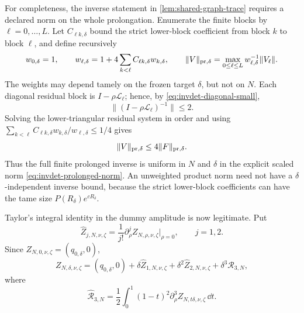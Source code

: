 For completeness, the inverse statement in \cref{lem:shared-graph-trace}
requires a declared norm on the whole prolongation.  Enumerate the finite
blocks by \(\ell=0,\ldots,L\).  Let \(C_{\ell k,\delta}\) bound the strict
lower-block coefficient from block \(k\) to block \(\ell\), and define
recursively
\begin{equation}
 w_{0,\delta}=1,\qquad
 w_{\ell,\delta}
 =1+4\sum_{k<\ell}C_{\ell k,\delta}w_{k,\delta},
 \qquad
 \|V\|_{\rm pr,\delta}
 =\max_{0\leq\ell\leq L}
     w_{\ell,\delta}^{-1}\|V_\ell\|.                \label{eq:invdet-prolonged-norm}
\end{equation}
The weights may depend tamely on the frozen target \(\delta\), but not on
\(N\).  Each diagonal residual block is
\(I-\rho\mathscr L_\ell\); hence, by
\cref{eq:invdet-diagonal-small},
\begin{equation}
 \|(I-\rho\mathscr L_\ell)^{-1}\|\leq2.             \label{eq:invdet-diagonal-inverse}
\end{equation}
Solving the lower-triangular residual system in order and using
\(\sum_{k<\ell}C_{\ell k,\delta}w_{k,\delta}/w_{\ell,\delta}\leq1/4\)
gives
\begin{equation}
 \|V\|_{\rm pr,\delta}\leq4\|F\|_{\rm pr,\delta}.  \label{eq:invdet-prolonged-inverse}
\end{equation}
Thus the full finite prolonged inverse is uniform in \(N\) and \(\delta\)
in the explicit scaled norm \cref{eq:invdet-prolonged-norm}.  An unweighted
product norm need not have a \(\delta\)-independent inverse bound, because
the strict lower-block coefficients can have the tame size
\(P(R_\delta)e^{cR_\delta}\).

Taylor's integral identity in the dummy amplitude is now legitimate.  Put
\begin{equation}
 \widehat Z_{j,N,\nu,\zeta}
 =\frac1{j!}\partial_\rho^jZ_{N,\rho,\nu,\zeta}\big|_{\rho=0},
 \qquad j=1,2.
\end{equation}
Since \(Z_{N,0,\nu,\zeta}=(q_{0,\delta},0)\),
\begin{equation}
 Z_{N,\delta,\nu,\zeta}
 =(q_{0,\delta},0)+\delta\widehat Z_{1,N,\nu,\zeta}
  +\delta^2\widehat Z_{2,N,\nu,\zeta}
  +\delta^3\widehat{\mathcal R}_{3,N},               \label{eq:invdet-Taylor}
\end{equation}
where
\begin{equation}
 \widehat{\mathcal R}_{3,N}
 =\frac12\int_0^1(1-t)^2
      \partial_\rho^3Z_{N,t\delta,\nu,\zeta}\,\dd t.             \label{eq:invdet-Taylor-remainder}
\end{equation}

